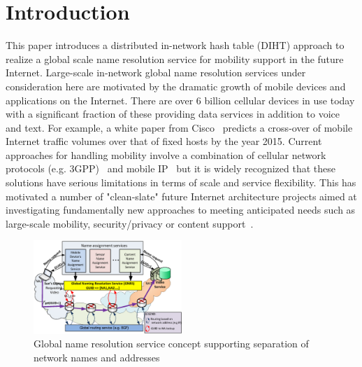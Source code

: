 \section{Introduction}
\label{sec:intro}
This paper introduces a distributed in-network hash table (DIHT) approach to realize a global scale name resolution service for mobility support in the future Internet. Large-scale in-network global name resolution services under consideration here are motivated by the dramatic growth of mobile devices and applications on the Internet. There are over 6 billion cellular devices in use today with a significant fraction of these providing data services in addition to voice and text. For example, a white paper from Cisco~\cite{cisco} predicts a cross-over of mobile Internet traffic volumes over that of fixed hosts by the year 2015. Current approaches for handling mobility involve a combination of cellular network protocols (e.g. 3GPP)~\cite{3gpp} and mobile IP~\cite{gundavelli} but it is widely recognized that these solutions have serious limitations in terms of scale and service flexibility. This has motivated a number of "clean-slate" future Internet architecture projects aimed at investigating fundamentally new approaches to meeting anticipated needs such as large-scale mobility, security/privacy or content support~\cite{fia}.
\begin{center}
    \begin{figure}[h]
            \vspace{-0.2in}
        \centering
        \includegraphics[width=0.5\textwidth]{figures/intro.eps}
        \caption{Global name resolution service concept supporting separation of network names and addresses
    }
        \label{fig:intro}
        \vspace{-0.2in}
    \end{figure}
\end{center}
